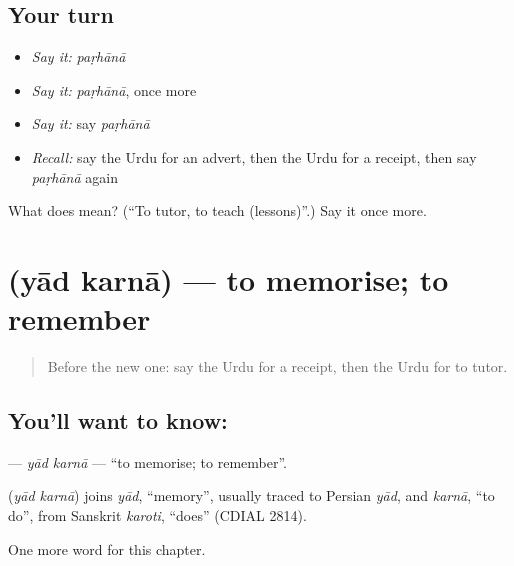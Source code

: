 \subsection*{Your turn}
\begin{itemize}
\raggedright
  \item \emph{Say it:} \emph{paṛhānā}
  \item \emph{Say it:} \emph{paṛhānā}, once more
  \item \emph{Say it:} say \emph{paṛhānā}
  \item \emph{Recall:} say the Urdu for an advert, then the Urdu for a receipt, then say \emph{paṛhānā} again
\end{itemize}

\begin{tcolorbox}[breakable,colback=teal!4,colframe=teal!35!black,title={Before you move on}]
What does  mean? (\textquotedblleft{}To tutor, to teach (lessons)\textquotedblright{}.) Say it once more.
\end{tcolorbox}
\section[\texorpdfstring{\ur{یاد} \ur{کرنا} (yād karnā)}{یاد کرنا (yād karnā)}]{  (yād karnā) — to memorise; to remember}

\label{lesson:UR-C147-yad-karna}



\begin{quote}
Before the new one: say the Urdu for a receipt, then the Urdu for to tutor.
\end{quote}

\subsection*{You'll want to know:  }
\textbf{ } — \emph{yād karnā} — \textquotedblleft{}to memorise; to remember\textquotedblright{}.

\begin{cousinweb}
\textbf{ } (\emph{yād karnā}) joins \emph{yād}, \textquotedblleft{}memory\textquotedblright{}, usually traced to Persian \emph{yād}, and \emph{karnā}, \textquotedblleft{}to do\textquotedblright{}, from Sanskrit \emph{karoti}, \textquotedblleft{}does\textquotedblright{} (CDIAL 2814).
\end{cousinweb}

\begin{grammarlens}[title={What you've built}]
One more word for this chapter.
\end{grammarlens}


